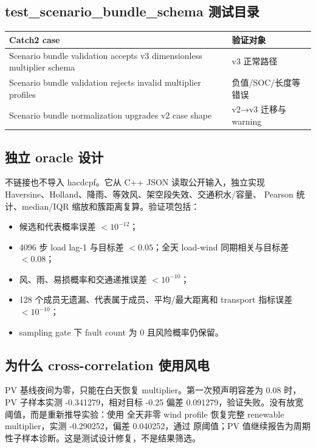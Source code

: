\subsection{test\_scenario\_bundle\_schema 测试目录}
\begin{longtable}{@{}L{8.0cm}L{6.0cm}@{}}
\toprule
Catch2 case & 验证对象\\
\midrule\endfirsthead
Scenario bundle validation accepts v3 dimensionless multiplier schema & v3 正常路径\\
Scenario bundle validation rejects invalid multiplier profiles & 负值/SOC/长度等错误\\
Scenario bundle normalization upgrades v2 case shape & v2→v3 迁移与 warning\\
\bottomrule
\end{longtable}

\subsection{独立 oracle 设计}
 不链接也不导入 hacdcpf。它从 C++ JSON
读取公开输入，独立实现 Haversine、Holland、降雨、等效风、架空段失效、交通积水/容量、
Pearson 统计、median/IQR 缩放和簇距离复算。验证项包括：
\begin{itemize}
  \item 候选和代表概率误差 $<10^{-12}$；
  \item 4096 步 load lag-1 与目标差 $<0.05$；全天 load-wind 同期相关与目标差 $<0.08$；
  \item 风、雨、易损概率和交通递推误差 $<10^{-10}$；
  \item 128 个成员无遗漏、代表属于成员、平均/最大距离和 transport 指标误差 $<10^{-10}$；
  \item sampling gate 下 fault count 为 0 且风险概率仍保留。
\end{itemize}

\subsection{为什么 cross-correlation 使用风电}
PV 基线夜间为零，只能在白天恢复 multiplier。第一次预声明容差为 0.08 时，PV 子样本实测
-0.341279，相对目标 -0.25 偏差 0.091279，验证失败。没有放宽阈值，而是重新推导实验：使用
全天非零 wind profile 恢复完整 renewable multiplier，实测 -0.290252，偏差 0.040252，通过
原阈值；PV 值继续报告为周期性子样本诊断。这是测试设计修复，不是结果筛选。

